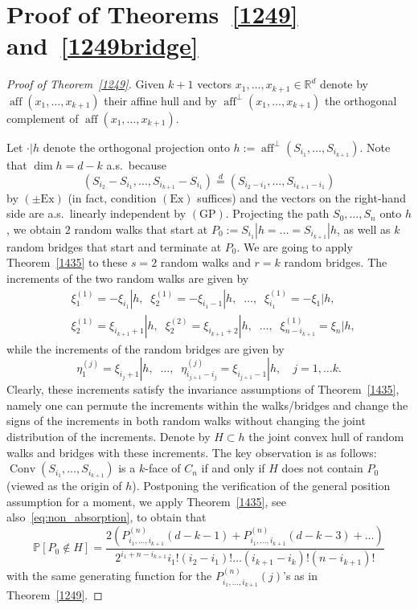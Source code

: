 \documentclass[12pt, reqno]{amsart}
\theoremstyle{plain}
\theoremstyle{definition}
\theoremstyle{remark}
\begin{document}
\section{Proof of Theorems~\ref{1249} and~\ref{1249bridge}}
\begin{proof}[Proof of Theorem~\ref{1249}]
Given $k+1$ vectors $x_1,\ldots,x_{k+1}\in{\mathbb{R}}^d$  denote by ${\mathop{\mathrm{aff}}\nolimits}(x_1,\ldots,x_{k+1})$ their affine hull and by ${\mathop{\mathrm{aff}}\nolimits}^\perp(x_1,\ldots,x_{k+1})$ the orthogonal complement of ${\mathop{\mathrm{aff}}\nolimits}(x_1,\ldots,x_{k+1})$.

Let $\cdot|h$ denote the orthogonal projection onto $h:={\mathop{\mathrm{aff}}\nolimits}^\perp(S_{i_1},\ldots,S_{i_{k+1}})$. Note that $\dim h = d - k$ a.s.\ because
$$
(S_{i_2} -S_{i_1},\ldots, S_{i_{k+1}} - S_{i_1}) {\stackrel{d}{=}} (S_{i_2-i_1},\ldots, S_{i_{k+1}-i_1})
$$
by $(\pm\text{Ex})$ (in fact, condition $(\text{Ex})$ suffices) and the vectors on the right-hand side are a.s.\ linearly independent by $(\text{GP})$.  Projecting the path $S_0,\ldots,S_n$ onto $h$, we obtain $2$ random walks that start at $P_0:=S_{i_1}|h = \ldots= S_{i_{k+1}}|h$, as well as $k$ random bridges that  start and terminate at $P_0$. We are going to apply Theorem~\ref{1435} to these $s=2$ random walks and $r=k$ random bridges. The increments of the two random walks are given by
\begin{align*}
&\xi_1^{(1)}=-\xi_{i_1}|h, \;\;  \xi_2^{(1)}=-\xi_{i_1-1}|h, \;\;  \ldots, \;\; \xi_{i_1}^{(1)}=-\xi_1|h,\\
&\xi_2^{(1)}=\xi_{i_{k+1}+1}|h,\;\; \xi_2^{(2)}=\xi_{i_{k+1}+2}|h, \;\; \ldots, \;\; \xi_{n-i_{k+1}}^{(1)}=\xi_n|h,
\end{align*}
while the increments of the random bridges are given by
$$
\eta_1^{(j)}=\xi_{i_j+1}|h, \;\; \ldots, \;\; \eta_{i_{j+1}-i_j}^{(j)}=\xi_{i_{j+1}-1}|h,
\quad j=1,\ldots k.
$$
Clearly, these increments satisfy the invariance assumptions of Theorem~\ref{1435}, namely one can permute the increments within the walks/bridges and change the signs of the increments in both random walks without changing the joint distribution of the increments.
Denote by $H\subset h$ the joint convex hull of random walks and bridges with these increments. The key observation is as follows:  ${\mathop{\mathrm{Conv}}\nolimits}(S_{i_1},\ldots,S_{i_{k+1}})$ is a $k$-face of $C_n$  if and only if $H$ does not contain $P_0$ (viewed as the origin of $h$).  Postponing the verification of the general position assumption for a moment, we apply Theorem~\ref{1435}, see also~\eqref{eq:non_absorption},  to obtain that
$$
{\mathbb{P}}[P_0\notin H]=
\frac{2(P_{i_1,\ldots,i_{k+1}}^{(n)}(d-k-1) + P_{i_1,\ldots,i_{k+1}}^{(n)}(d-k-3)+\ldots)}{2^{i_1+n-i_{k+1}} i_1!(i_2-i_1)!\ldots  (i_{k+1}-i_k)! (n-i_{k+1})!}
$$
with the same generating function for the $P_{i_1,\ldots,i_{k+1}}^{(n)}(j)$'s as in Theorem~\ref{1249}.


\end{proof}
\end{document}
